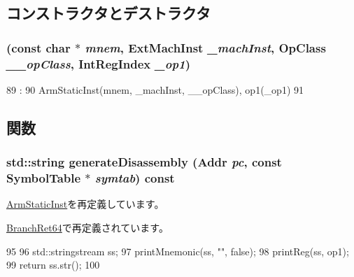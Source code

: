 \subsection{コンストラクタとデストラクタ}
\hypertarget{classArmISA_1_1BranchReg64_a82752dfaa681072da7204137444208b8}{
\subsubsection[{BranchReg64}]{ (const char $\ast$ {\em mnem}, \/  {\bf ExtMachInst} {\em \_\-machInst}, \/  OpClass {\em \_\-\_\-opClass}, \/  {\bf IntRegIndex} {\em \_\-op1})}}
\label{classArmISA_1_1BranchReg64_a82752dfaa681072da7204137444208b8}



\begin{DoxyCode}
89                                   :
90         ArmStaticInst(mnem, _machInst, __opClass), op1(_op1)
91     {}

\end{DoxyCode}


\subsection{関数}
\hypertarget{classArmISA_1_1BranchReg64_a95d323a22a5f07e14d6b4c9385a91896}{
\subsubsection[{generateDisassembly}]{\setlength{\rightskip}{0pt plus 5cm}std::string generateDisassembly ({\bf Addr} {\em pc}, \/  const SymbolTable $\ast$ {\em symtab}) const}}
\label{classArmISA_1_1BranchReg64_a95d323a22a5f07e14d6b4c9385a91896}


\hyperlink{classArmISA_1_1ArmStaticInst_a95d323a22a5f07e14d6b4c9385a91896}{ArmStaticInst}を再定義しています。

\hyperlink{classArmISA_1_1BranchRet64_a95d323a22a5f07e14d6b4c9385a91896}{BranchRet64}で再定義されています。


\begin{DoxyCode}
95 {
96     std::stringstream ss;
97     printMnemonic(ss, "", false);
98     printReg(ss, op1);
99     return ss.str();
100 }
\end{DoxyCode}


